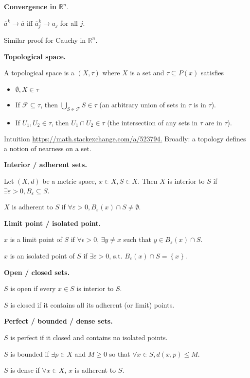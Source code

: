 \documentclass[12pt]{article}
\newcommand{\RR}{\mathbb{R}}
\newcommand{\eps}{\epsilon}
\newcommand{\ol}{\overline}
\begin{document}
{\bf Convergence in $\RR^n$}.  

$\ol{a}^{k} \to \ol{a}$ iff $\ol{a}_j^{k} \to a_j$ for all $j$.

Similar proof for Cauchy in $\RR^n$.

{\bf Topological space.}  

A topological space is a $(X, \tau)$ where $X$ is a set and $\tau \subseteq P(x)$ satisfies

\begin{itemize}
  \item $\emptyset, X \in \tau$
  \item If $\mathcal{F} \subseteq \tau$, then $\bigcup_{S \in \mathcal{F}} S \in \tau$ (an arbitrary union of sets in $\tau$ is in $\tau$).
  \item If $U_1, U_2 \in \tau$, then $U_1 \cap U_2 \in \tau$ (the intersection of any sets in $\tau$ are in $\tau$).
\end{itemize}

Intuition \url{https://math.stackexchange.com/a/523794.}  Broadly: a topology defines a notion of nearness on a set.

{\bf Interior / adherent sets.}

Let $(X, d)$ be a metric space, $x \in X, S \in X$.  Then $X$ is interior to $S$ if $\exists \varepsilon > 0, B_{\varepsilon} \subseteq S$.

$X$ is adherent to $S$ if $\forall \varepsilon > 0, B_{\varepsilon}(x) \cap S \neq \emptyset$.

{\bf Limit point / isolated point.}

$x$ is a limit point of $S$ if $\forall \eps > 0$, $\exists y \neq x$ such that $y \in B_{\varepsilon}(x) \cap S$.

$x$ is an isolated point of $S$ if $\exists \varepsilon > 0$, s.t. $B_{\varepsilon} (x) \cap S= \left\{ x \right\}$.

{\bf Open / closed sets.}

$S$ is open if every $x \in S$ is interior to $S$.

$S$ is closed if it contains all its adherent (or limit) points.

{\bf Perfect / bounded / dense sets.}

$S$ is perfect if it closed and contains no isolated points.

$S$ is bounded if $\exists p \in X$ and $M \geq 0$ so that $\forall x \in S, d(x, p) \leq M$.

$S$ is dense if $\forall x \in X$, $x$ is adherent to $S$.
\end{document}
